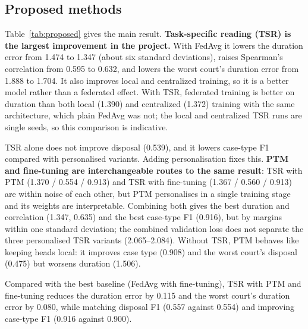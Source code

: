 \subsection{Proposed methods}
Table~\ref{tab:proposed} gives the main result. \textbf{Task-specific reading (TSR) is the largest improvement in the project.} With FedAvg it lowers the duration error from 1.474 to 1.347 (about six standard deviations), raises Spearman's correlation from 0.595 to 0.632, and lowers the worst court's duration error from 1.888 to 1.704. It also improves local and centralized training, so it is a better model rather than a federated effect. With TSR, federated training is better on duration than both local (1.390) and centralized (1.372) training with the same architecture, which plain FedAvg was not; the local and centralized TSR runs are single seeds, so this comparison is indicative.

TSR alone does not improve disposal (0.539), and it lowers case-type F1 compared with personalised variants. Adding personalisation fixes this. \textbf{PTM and fine-tuning are interchangeable routes to the same result}: TSR with PTM (1.370 / 0.554 / 0.913) and TSR with fine-tuning (1.367 / 0.560 / 0.913) are within noise of each other, but PTM personalises in a single training stage and its weights are interpretable. Combining both gives the best duration and correlation (1.347, 0.635) and the best case-type F1 (0.916), but by margins within one standard deviation; the combined validation loss does not separate the three personalised TSR variants (2.065--2.084). Without TSR, PTM behaves like keeping heads local: it improves case type (0.908) and the worst court's disposal (0.475) but worsens duration (1.506).

Compared with the best baseline (FedAvg with fine-tuning), TSR with PTM and fine-tuning reduces the duration error by 0.115 and the worst court's duration error by 0.080, while matching disposal F1 (0.557 against 0.554) and improving case-type F1 (0.916 against 0.900).

